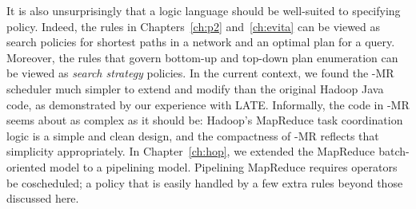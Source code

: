 It is also unsurprisingly that a logic language should be well-suited to specifying policy. Indeed, 
the rules in Chapters~\ref{ch:p2} and~\ref{ch:evita} can be viewed as search policies for shortest 
paths in a network and an optimal plan for a query. Moreover, the rules that govern bottom-up
and top-down plan enumeration can be viewed as {\em search strategy} policies. In the current context, we found 
the \BOOM-MR scheduler much simpler to extend and modify than the original Hadoop Java code, as demonstrated 
by our experience with LATE\@.  Informally, the \OVERLOG code in \BOOM-MR seems about as complex as it should be: 
Hadoop's MapReduce task coordination logic is a simple and clean design, and the compactness of \BOOM-MR reflects 
that simplicity appropriately. In Chapter~\ref{ch:hop}, we extended the MapReduce batch-oriented model to a pipelining 
model. Pipelining MapReduce requires operators be coscheduled; a policy that is easily handled by a few extra \OVERLOG 
rules beyond those discussed here.





